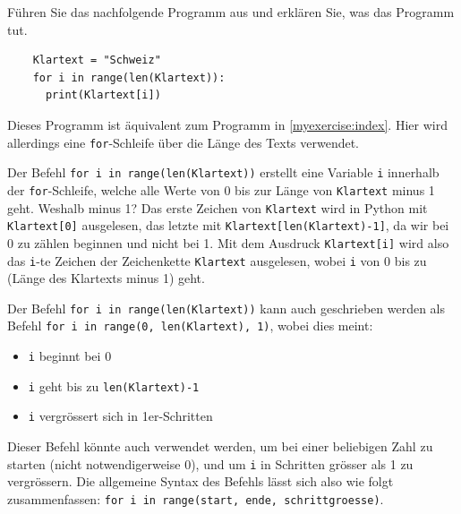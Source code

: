 \begin{myexercise}
    Führen Sie das nachfolgende Programm aus und erklären Sie, was das Programm tut.
    \begin{lstlisting}
    Klartext = "Schweiz"
    for i in range(len(Klartext)):
      print(Klartext[i])
  \end{lstlisting}
    \begin{myanswer}
        Dieses Programm ist äquivalent zum Programm in \cref{myexercise:index}.
        Hier wird allerdings eine \lstinline|for|-Schleife über die Länge des Texts verwendet.
    \end{myanswer}
\end{myexercise}

Der Befehl \lstinline|for i in range(len(Klartext))| erstellt eine Variable \lstinline|i| innerhalb der \lstinline|for|-Schleife, welche alle Werte von 0 bis zur Länge von \lstinline|Klartext| minus 1 geht. Weshalb minus 1? Das erste Zeichen von \lstinline|Klartext| wird in Python mit \lstinline|Klartext[0]| ausgelesen, das letzte mit \lstinline|Klartext[len(Klartext)-1]|, da wir bei 0 zu zählen beginnen und nicht bei 1. Mit dem Ausdruck \lstinline|Klartext[i]| wird also das \lstinline|i|-te Zeichen der Zeichenkette \lstinline|Klartext| ausgelesen, wobei \lstinline|i| von 0 bis zu (Länge des Klartexts minus 1) geht.

Der Befehl \lstinline|for i in range(len(Klartext))| kann auch geschrieben werden als Befehl \lstinline|for i in range(0, len(Klartext), 1)|, wobei dies meint:
\begin{itemize}
    \item \lstinline|i| beginnt bei 0
    \item \lstinline|i| geht bis zu \lstinline|len(Klartext)-1|
    \item \lstinline|i| vergrössert sich in 1er-Schritten
\end{itemize}
Dieser Befehl könnte auch verwendet werden, um bei einer beliebigen Zahl zu starten (nicht notwendigerweise 0), und um \lstinline|i| in Schritten grösser als 1 zu vergrössern. Die allgemeine Syntax des Befehls lässt sich also wie folgt zusammenfassen: \lstinline|for i in range(start, ende, schrittgroesse)|.

